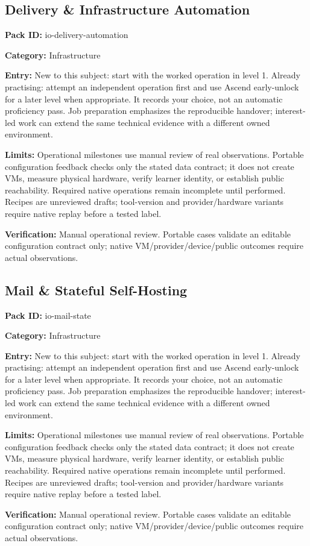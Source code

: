 \subsection{Delivery \& Infrastructure Automation}
\noindent\textbf{Pack ID:} io-delivery-automation\par
\noindent\textbf{Category:} Infrastructure\par
\noindent\textbf{Entry:} New to this subject: start with the worked operation in level 1. Already practising: attempt an independent operation first and use Ascend early-unlock for a later level when appropriate. It records your choice, not an automatic proficiency pass. Job preparation emphasizes the reproducible handover; interest-led work can extend the same technical evidence with a different owned environment.\par
\noindent\textbf{Limits:} Operational milestones use manual review of real observations. Portable configuration feedback checks only the stated data contract; it does not create VMs, measure physical hardware, verify learner identity, or establish public reachability. Required native operations remain incomplete until performed. Recipes are unreviewed drafts; tool-version and provider/hardware variants require native replay before a tested label.\par
\noindent\textbf{Verification:} Manual operational review. Portable cases validate an editable configuration contract only; native VM/provider/device/public outcomes require actual observations.\par
\subsection{Mail \& Stateful Self-Hosting}
\noindent\textbf{Pack ID:} io-mail-state\par
\noindent\textbf{Category:} Infrastructure\par
\noindent\textbf{Entry:} New to this subject: start with the worked operation in level 1. Already practising: attempt an independent operation first and use Ascend early-unlock for a later level when appropriate. It records your choice, not an automatic proficiency pass. Job preparation emphasizes the reproducible handover; interest-led work can extend the same technical evidence with a different owned environment.\par
\noindent\textbf{Limits:} Operational milestones use manual review of real observations. Portable configuration feedback checks only the stated data contract; it does not create VMs, measure physical hardware, verify learner identity, or establish public reachability. Required native operations remain incomplete until performed. Recipes are unreviewed drafts; tool-version and provider/hardware variants require native replay before a tested label.\par
\noindent\textbf{Verification:} Manual operational review. Portable cases validate an editable configuration contract only; native VM/provider/device/public outcomes require actual observations.\par
